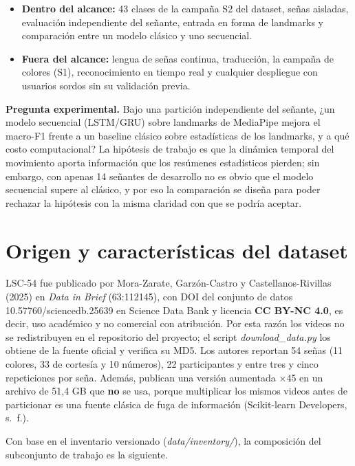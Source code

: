 \documentclass[11pt,a4paper]{article}
\newcommand{\code}[1]{\textit{#1}}
\begin{document}
\begin{itemize}
\item \textbf{Dentro del alcance:} 43 clases de la campaña S2 del dataset, señas aisladas, evaluación independiente del señante, entrada en forma de landmarks y comparación entre un modelo clásico y uno secuencial.
\item \textbf{Fuera del alcance:} lengua de señas continua, traducción, la campaña de colores (S1), reconocimiento en tiempo real y cualquier despliegue con usuarios sordos sin su validación previa.
\end{itemize}

\textbf{Pregunta experimental.} Bajo una partición independiente del señante, ¿un modelo secuencial (LSTM/GRU) sobre landmarks de MediaPipe mejora el macro-F1 frente a un baseline clásico sobre estadísticas de los landmarks, y a qué costo computacional? La hipótesis de trabajo es que la dinámica temporal del movimiento aporta información que los resúmenes estadísticos pierden; sin embargo, con apenas 14 señantes de desarrollo no es obvio que el modelo secuencial supere al clásico, y por eso la comparación se diseña para poder rechazar la hipótesis con la misma claridad con que se podría aceptar.

\section{Origen y características del dataset}

LSC-54 fue publicado por Mora-Zarate, Garzón-Castro y Castellanos-Rivillas (2025) en \emph{Data in Brief} (63:112145), con DOI del conjunto de datos 10.57760/sciencedb.25639 en Science Data Bank y licencia \textbf{CC BY-NC 4.0}, es decir, uso académico y no comercial con atribución. Por esta razón los videos no se redistribuyen en el repositorio del proyecto; el script \code{download\_data.py} los obtiene de la fuente oficial y verifica su MD5. Los autores reportan 54 señas (11 colores, 33 de cortesía y 10 números), 22 participantes y entre tres y cinco repeticiones por seña. Además, publican una versión aumentada ×45 en un archivo de 51,4 GB que \textbf{no} se usa, porque multiplicar los mismos videos antes de particionar es una fuente clásica de fuga de información (Scikit-learn Developers, s.~f.).

Con base en el inventario versionado (\code{data/inventory/}), la composición del subconjunto de trabajo es la siguiente.
\end{document}
